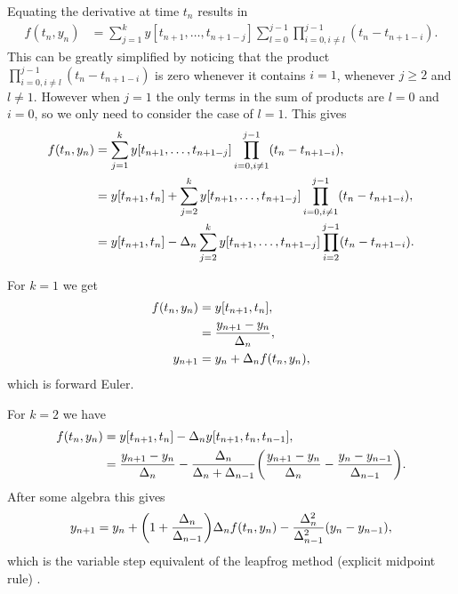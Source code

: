 Equating the derivative at time $t_n$ results in
\begin{equation}
  \begin{aligned}
    f(t_n, y_n) &= \sum_{j=1}^k y[t_{n+1}, \ldots, t_{n+1-j}] \sum_{l=0}^{j-1} \prod_{i=0, i \neq l}^{j-1} (t_n - t_{n+1-i}).
  \end{aligned}
\end{equation} 
This can be greatly simplified by noticing that the product $ \prod_{i=0, i \neq l}^{j-1} (t_n - t_{n+1-i})$ is zero whenever it contains $i=1$, \ie whenever $j \geq 2$ and $l \neq 1$.
However when $j=1$ the only terms in the sum of products are $l=0$ and $i=0$, so we only need to consider the case of $l=1$.
This gives
\begin{equation}
  \begin{aligned}
    f(t_n, y_n) &= \sum_{j=1}^k y[t_{n+1}, \ldots, t_{n+1-j}] \prod_{i=0, i \neq 1}^{j-1} (t_n - t_{n+1-i}), \\
    &= y[t_{n+1}, t_n] + \sum_{j=2}^k y[t_{n+1}, \ldots, t_{n+1-j}] \prod_{i=0, i \neq 1}^{j-1} (t_n - t_{n+1-i}), \\
    &= y[t_{n+1}, t_n] -\Delta_{n} \sum_{j=2}^k y[t_{n+1}, \ldots, t_{n+1-j}] \prod_{i=2}^{j-1} (t_n - t_{n+1-i}). \\
  \end{aligned}
\end{equation}

For $k=1$ we get
\begin{equation}
  \begin{aligned}
    f(t_n, y_n) &= y[t_{n+1}, t_n], \\
    &= \frac{y_{n+1} - y_n}{\Delta_{n}}, \\
    y_{n+1} &= y_n + \Delta_{n} f(t_n, y_n), \\
  \end{aligned}
\end{equation} 
which is forward Euler.

For $k=2$ we have
\begin{equation}
  \begin{aligned}
    f(t_n, y_n) &= y[t_{n+1}, t_n] - \Delta_{n} y[t_{n+1}, t_n, t_{n-1}] , \\
    &=  \frac{y_{n+1} - y_n}{\Delta_{n}} 
    - \frac{\Delta_{n}}{\Delta_{n} + \Delta_{n-1}} {\left(  \frac{y_{n+1} - y_n}{\Delta_{n}} - \frac{y_n - y_{n-1}}{\Delta_{n-1}} \right)}.
  \end{aligned}
\end{equation}
After some algebra this gives
\begin{equation}
  \label{eq:emr-derivation-rearranged}
  y_{n+1} = y_n + {\left( 1 + \frac{\Delta_{n}}{\Delta_{n-1}} \right)}\Delta_{n} f(t_n, y_n)
    - \frac{\Delta_{n}^2}{\Delta_{n-1}^2}(y_n - y_{n-1}),
\end{equation}
which is the variable step equivalent of the leapfrog method (explicit midpoint rule) \cite[pg. 715]{GreshoSani}.

